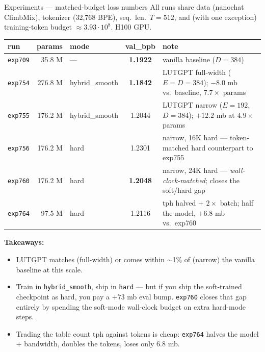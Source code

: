 \documentclass[aspectratio=169]{beamer}
\begin{document}
\begin{frame}{Experiments --- matched-budget loss numbers}
All runs share data (nanochat ClimbMix), tokenizer (32{,}768 BPE), seq.\ len.\ \(T=512\), and (with one exception) training-token budget \(\approx 3.93 \cdot 10^{8}\). H100 GPU.

\medskip
\centering
\scriptsize
\begin{tabular}{@{}l r l c p{6.2cm}@{}}
\toprule
\textbf{run} & \textbf{params} & \textbf{mode} & \textbf{val\_bpb} & \textbf{note} \\
\midrule
\texttt{exp709} & 35.8 M  & ---            & \textbf{1.1922} & vanilla baseline (\(D = 384\)) \\
\texttt{exp754} & 276.8 M & hybrid\_smooth & \textbf{1.1842} & LUTGPT full-width (\(E\!=\!D\!=\!384\)); \(-8.0\) mb vs.\ baseline, \(7.7\times\) params \\
\texttt{exp755} & 176.2 M & hybrid\_smooth & 1.2044          & LUTGPT narrow (\(E\!=\!192\), \(D\!=\!384\)); \(+12.2\) mb at \(4.9\times\) params \\
\texttt{exp756} & 176.2 M & hard           & 1.2301          & narrow, 16K hard --- token-matched hard counterpart to exp755 \\
\texttt{exp760} & 176.2 M & hard           & \textbf{1.2048} & narrow, 24K hard --- \emph{wall-clock-matched}; closes the soft/hard gap \\
\texttt{exp764} & 97.5 M  & hard           & 1.2116          & tph halved + \(2\times\) batch; half the model, \(+6.8\) mb vs.\ exp760 \\
\bottomrule
\end{tabular}

\vspace{1em}
\textbf{Takeaways:}
\begin{itemize}
\item LUTGPT matches (full-width) or comes within \(\sim\)1\% of (narrow) the vanilla baseline at this scale.
\item Train in \texttt{hybrid\_smooth}, ship in \texttt{hard} --- but if you ship the soft-trained checkpoint as hard, you pay a \(+73\) mb eval bump. \texttt{exp760} closes that gap entirely by spending the soft-mode wall-clock budget on extra hard-mode steps.
\item Trading the table count \(\mathrm{tph}\) against tokens is cheap: \texttt{exp764} halves the model + bandwidth, doubles the tokens, loses only \(6.8\) mb.
\end{itemize}
\end{frame}
\end{document}
